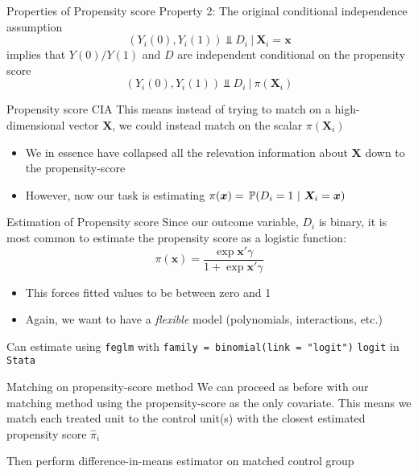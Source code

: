 \documentclass[aspectratio=169,t,11pt,table]{beamer}
\begin{document}
\begin{frame}{Properties of Propensity score}
  Property 2: The original conditional independence assumption
  $$
    (Y_{i}(0), Y_{i}(1)) \Perp D_i \ \vert \ \bm{X}_i = \bm{x}
  $$
  implies that $Y(0)/Y(1)$ and $D$ are independent conditional on the propensity score
  $$
    (Y_{i}(0), Y_{i}(1)) \Perp D_i \ \vert \ \pi(\bm{X}_i)
  $$
\end{frame}

\begin{frame}{Propensity score CIA}
  This means instead of trying to match on a high-dimensional vector $\bm{X}$, we could instead match on the scalar $\pi(\bm{X}_i)$
  \begin{itemize}
    \item We in essence have collapsed all the relevation information about $\bm{X}$ down to the propensity-score
    
    \item However, now our task is estimating $\pi(\bm{x}) = \prob{D_i = 1}{\bm{X}_i = \bm{x}}$
  \end{itemize}
\end{frame}

\begin{frame}{Estimation of Propensity score}
  Since our outcome variable, $D_i$ is binary, it is most common to estimate the propensity score as a logistic function:
  $$
    \pi(\bm{x}) = \frac{\exp{\bm{x}' \gamma}}{1 + \exp{\bm{x}' \gamma}}
  $$
  \begin{itemize}
    \item This forces fitted values to be between zero and 1
    \item Again, we want to have a \emph{flexible} model (polynomials, interactions, etc.)
  \end{itemize}

  \pause
  \bigskip
  Can estimate using \texttt{feglm} with \texttt{family = binomial(link = "logit")} \texttt{logit} in \texttt{Stata}
\end{frame}

\begin{frame}{Matching on propensity-score method}
  We can proceed as before with our matching method using the propensity-score as the only covariate. This means we match each treated unit to the control unit(s) with the closest estimated propensity score $\hat{\pi}_i$

  \bigskip
  Then perform difference-in-means estimator on matched control group
\end{frame}
\end{document}
